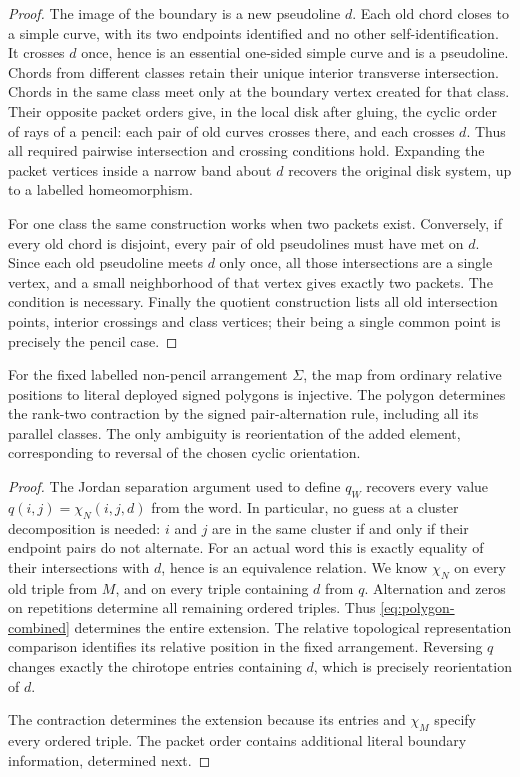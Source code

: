 \begin{proof}
The image of the boundary is a new pseudoline $d$.  Each old chord
closes to a simple curve, with its two endpoints identified and no
other self-identification.  It crosses $d$ once, hence is an essential
one-sided simple curve and is a pseudoline.  Chords from different
classes retain their unique interior transverse intersection.  Chords
in the same class meet only at the boundary vertex created for that
class.  Their opposite packet orders give, in the local disk after
gluing, the cyclic order of rays of a pencil: each pair of old curves
crosses there, and each crosses $d$.  Thus all required pairwise
intersection and crossing conditions hold.  Expanding the packet
vertices inside a narrow band about $d$ recovers the original disk
system, up to a labelled homeomorphism.

For one class the same construction works when two packets exist.
Conversely, if every old chord is disjoint, every pair of old
pseudolines must have met on $d$.  Since each old pseudoline meets
$d$ only once, all those intersections are a single vertex, and a
small neighborhood of that vertex gives exactly two packets.  The
condition is necessary.  Finally the quotient construction lists all
old intersection points, interior crossings and class vertices;
their being a single common point is precisely the pencil case.
\end{proof}

\begin{proposition}\label{prop:polygon-injective}

For the fixed labelled non-pencil arrangement $\Sigma$, the map from
ordinary relative positions to literal deployed signed
polygons is injective.  The polygon determines the rank-two
contraction by the signed pair-alternation rule, including all its
parallel classes.  The only ambiguity is reorientation of the added
element, corresponding to reversal of the chosen cyclic orientation.
\end{proposition}
\begin{proof}

The Jordan separation argument used to define $q_W$ recovers every value
$q(i,j)=\chi_N(i,j,d)$ from the word.  In particular, no guess at a
cluster decomposition is needed: $i$ and $j$ are in the same cluster
if and only if their endpoint pairs do not alternate.  For an actual
word this is exactly equality of their intersections with $d$, hence
is an equivalence relation.  We know $\chi_N$ on every old triple
from $M$, and on every triple containing $d$ from $q$.  Alternation
and zeros on repetitions determine all remaining ordered triples.
Thus \eqref{eq:polygon-combined} determines the entire extension.  The
relative topological representation comparison identifies its
relative position in the fixed arrangement.  Reversing $q$ changes
exactly the chirotope entries containing $d$, which is precisely
reorientation of $d$.

The contraction determines the extension because its entries and
$\chi_M$ specify every ordered triple. The packet order contains
additional literal boundary information, determined next.
\end{proof}

